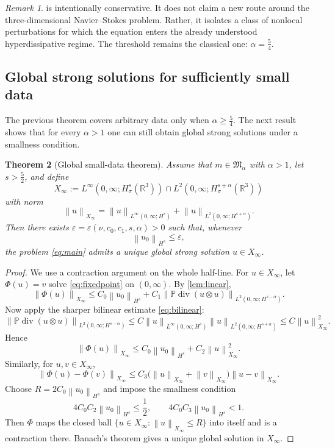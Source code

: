 \documentclass[11pt]{article}
\newtheorem{theorem}{Theorem}[section]
\theoremstyle{definition}
\theoremstyle{remark}
\newtheorem{remark}[theorem]{Remark}
\newcommand{\R}{\mathbb{R}}
\newcommand{\Pcal}{\mathbb{P}}
\newcommand{\norm}[1]{\left\lVert #1\right\rVert}
\newcommand{\diver}{\operatorname{div}}
\begin{document}
\begin{remark}
 is intentionally conservative. It does not claim a new route around the three-dimensional Navier--Stokes problem. Rather, it isolates a class of nonlocal perturbations for which the equation enters the already understood hyperdissipative regime. The threshold remains the classical one: $\alpha=\frac54$.
\end{remark}

\subsection{Global strong solutions for sufficiently small data}

The previous theorem covers arbitrary data only when $\alpha\ge \frac54$. The next result shows that for every $\alpha>1$ one can still obtain global strong solutions under a smallness condition.

\begin{theorem}[Global small-data theorem]\label{thm:smalldata}
Assume that $m\in\mathfrak M_\alpha$ with $\alpha>1$, let $s>\frac52$, and define
\[
X_\infty
:=
L^\infty(0,\infty;H^s_\sigma(\R^3))
\cap
L^2(0,\infty;H^{s+\alpha}_\sigma(\R^3))
\]
with norm
\[
\norm{u}_{X_\infty}
=
\norm{u}_{L^\infty(0,\infty;H^s)}
+
\norm{u}_{L^2(0,\infty;H^{s+\alpha})}.
\]
Then there exists $\varepsilon=\varepsilon(\nu,c_0,c_1,s,\alpha)>0$ such that, whenever
\[
\norm{u_0}_{H^s}\le \varepsilon,
\]
the problem \eqref{eq:main} admits a unique global strong solution $u\in X_\infty$.
\end{theorem}

\begin{proof}
We use a contraction argument on the whole half-line. For $u\in X_\infty$, let $\Phi(u)=v$ solve \eqref{eq:fixedpoint} on $(0,\infty)$. By \cref{lem:linear},
\[
\norm{\Phi(u)}_{X_\infty}
\le
C_0 \norm{u_0}_{H^s}
+
C_1 \norm{\Pcal\diver(u\otimes u)}_{L^2(0,\infty;H^{s-\alpha})}.
\]
Now apply the sharper bilinear estimate \eqref{eq:bilinear}:
\[
\norm{\Pcal\diver(u\otimes u)}_{L^2(0,\infty;H^{s-\alpha})}
\le
C \norm{u}_{L^\infty(0,\infty;H^s)} \norm{u}_{L^2(0,\infty;H^{s+\alpha})}
\le
C \norm{u}_{X_\infty}^2.
\]
Hence
\begin{equation}\label{eq:global-map}
\norm{\Phi(u)}_{X_\infty}
\le
C_0 \norm{u_0}_{H^s}
+
C_2 \norm{u}_{X_\infty}^2.
\end{equation}
Similarly, for $u,v\in X_\infty$,
\[
\norm{\Phi(u)-\Phi(v)}_{X_\infty}
\le
C_3 \bigl(\norm{u}_{X_\infty}+\norm{v}_{X_\infty}\bigr)\norm{u-v}_{X_\infty}.
\]
Choose $R=2C_0\norm{u_0}_{H^s}$ and impose the smallness condition
\[
4 C_0 C_2 \norm{u_0}_{H^s} \le \frac12,
\qquad
4 C_0 C_3 \norm{u_0}_{H^s} < 1.
\]
Then $\Phi$ maps the closed ball $\{u\in X_\infty:\norm{u}_{X_\infty}\le R\}$ into itself and is a contraction there. Banach's theorem gives a unique global solution in $X_\infty$.
\end{proof}
\end{document}

